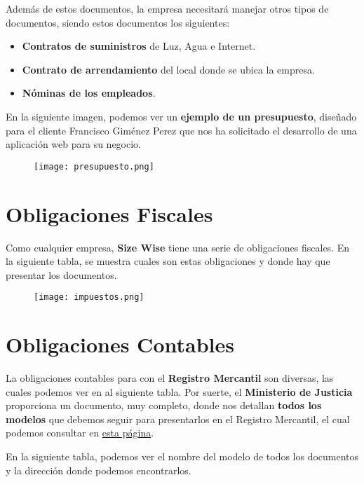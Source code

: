 Además de estos documentos, la empresa necesitará manejar otros tipos de documentos, siendo estos documentos los siguientes:

\begin{itemize}
    \item \textbf{Contratos de suministros} de Luz, Agua e Internet.
    \item \textbf{Contrato de arrendamiento} del local donde se ubica la empresa.
    \item \textbf{Nóminas de los empleados}.
\end{itemize}

En la siguiente imagen, podemos ver un \textbf{ejemplo de un presupuesto}, diseñado para el cliente Francisco Giménez Perez que nos ha solicitado el desarrollo de una aplicación web para su negocio.

\begin{figure}[H]
    \centering
    \texttt{[image: presupuesto.png]}
\end{figure}

\section{Obligaciones Fiscales}
Como cualquier empresa, \textbf{Size Wise} tiene una serie de obligaciones fiscales. En la siguiente tabla, se muestra cuales son estas obligaciones y donde hay que presentar los documentos.

\begin{figure}[H]
    \centering
    \texttt{[image: impuestos.png]}
\end{figure}

\section{Obligaciones Contables}
La obligaciones contables para con el \textbf{Registro Mercantil} son diversas, las cuales podemos ver en al siguiente tabla. Por suerte, el \textbf{Ministerio de Justicia} proporciona un documento, muy completo, donde nos detallan \textbf{todos los modelos} que debemos seguir para presentarlos en el Registro Mercantil, el cual podemos consultar en \href{https://www.mjusticia.gob.es/es/Ciudadano/Registros/Documents/Normal%20Castellano%20Editable%202022.pdf}{esta página}.

En la siguiente tabla, podemos ver el nombre del modelo de todos los documentos y la dirección donde podemos encontrarlos.

